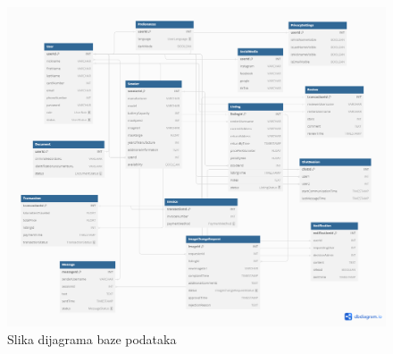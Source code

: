 \begin{figure} [H]
	
	\includegraphics[width=1\linewidth]{slike/RelacijskiDijagramBP.png}
	\centering
	\caption{Slika dijagrama baze podataka}
	\label{fig:Slika dijagrama baze podataka}
\end{figure}
